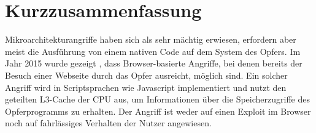 \chapter*{Kurzzusammenfassung}


Mikroarchitekturangriffe haben sich als sehr mächtig erwiesen, erfordern aber meist die Ausführung von einem nativen Code auf dem System des Opfers.
Im Jahr 2015 wurde gezeigt \cite{TheSpyInTheSandbox}, dass Browser-basierte Angriffe, bei denen bereits der Besuch einer Webseite durch das Opfer ausreicht, möglich sind.
Ein solcher Angriff wird in Scriptsprachen wie Javascript implementiert und nutzt den geteilten L3-Cache der CPU aus, um Informationen über die Speicherzugriffe des Opferprogramms zu erhalten.
Der Angriff ist weder auf einen Exploit im Browser noch auf fahrlässiges Verhalten der Nutzer angewiesen.




